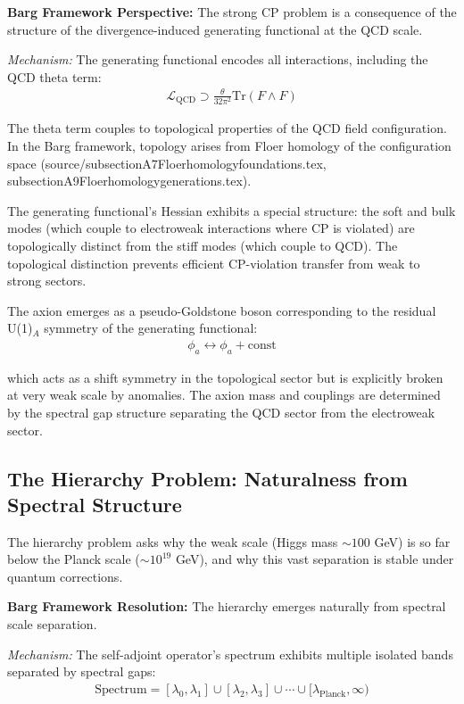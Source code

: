 \documentclass[12pt,a4paper]{article}
\begin{document}
\textbf{Barg Framework Perspective:} The strong CP problem is a consequence of the structure of the divergence-induced generating functional at the QCD scale.

\textit{Mechanism:} The generating functional encodes all interactions, including the QCD theta term:
\begin{align}
\mathcal{L}_{\text{QCD}} \supset \frac{\theta}{32\pi^2} \text{Tr}(F \wedge F)
\end{align}

The theta term couples to topological properties of the QCD field configuration. In the Barg framework, topology arises from Floer homology of the configuration space (source/subsectionA7Floerhomologyfoundations.tex, subsectionA9Floerhomologygenerations.tex).

The generating functional's Hessian exhibits a special structure: the soft and bulk modes (which couple to electroweak interactions where CP is violated) are topologically distinct from the stiff modes (which couple to QCD). The topological distinction prevents efficient CP-violation transfer from weak to strong sectors.

The axion emerges as a pseudo-Goldstone boson corresponding to the residual U(1)$_A$ symmetry of the generating functional:
\begin{align}
\phi_a \leftrightarrow \phi_a + \text{const}
\end{align}

which acts as a shift symmetry in the topological sector but is explicitly broken at very weak scale by anomalies. The axion mass and couplings are determined by the spectral gap structure separating the QCD sector from the electroweak sector.

\subsection{The Hierarchy Problem: Naturalness from Spectral Structure}

The hierarchy problem asks why the weak scale (Higgs mass $\sim 100$ GeV) is so far below the Planck scale ($\sim 10^{19}$ GeV), and why this vast separation is stable under quantum corrections.

\textbf{Barg Framework Resolution:} The hierarchy emerges naturally from spectral scale separation.

\textit{Mechanism:} The self-adjoint operator's spectrum exhibits multiple isolated bands separated by spectral gaps:
\begin{align}
\text{Spectrum} = [\lambda_0, \lambda_1] \cup [\lambda_2, \lambda_3] \cup \cdots \cup [\lambda_{\text{Planck}}, \infty)
\end{align}
\end{document}
